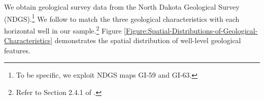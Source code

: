 We obtain geological survey data from the North Dakota Geological Survey (NDGS).\footnote{To be specific, we exploit NDGS maps GI-59 and GI-63.} We follow \cite{Experiential-and-Social-Learning-in-Firms_Covert_2015} to match the three geological characteristics with each horizontal well in our sample.\footnote{Refer to Section 2.4.1 of \cite{Experiential-and-Social-Learning-in-Firms_Covert_2015}.} Figure \ref{Figure:Spatial-Distributions-of-Geological-Characteristics} demonstrates the spatial distribution of well-level geological features. 

